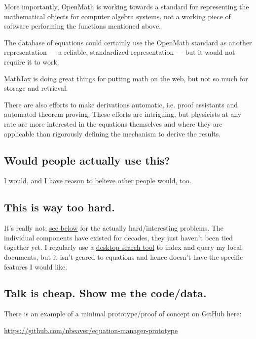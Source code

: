 \documentclass[12pt,letterpaper]{article}
\begin{document}
More importantly,
OpenMath is working towards a standard for representing the mathematical objects for computer algebra systems,
not a working piece of software performing the functions mentioned above.

The database of equations could certainly use the OpenMath standard as another representation
--- a reliable, standardized representation ---
but it would not require it to work.

\href{http://www.mathjax.org/}
{MathJax} is doing great things for putting math on the web,
but not so much for storage and retrieval.

There are also efforts to make derivations automatic,
i.e. proof assistants and automated theorem proving.
These efforts are intriguing,
but physicists at any rate are more interested in the equations themselves and where they are applicable
than rigorously defining the mechanism to derive the results.

\subsection{Would people actually use this?}

I would, and I have
\href{http://www.researchgate.net/post/I_am_looking_for_an_equation_database_or_digital_list_of_equations}
{reason to believe}
\href{http://productforums.google.com/forum/#!topic/websearch/lVJiyCSl-xk}
{other people would, too}.

\subsection{This is way too hard.}

It's really not;
\hyperref[sec:ambitious]
{see below} for the actually hard/interesting problems.
The individual components have existed for decades,
they just haven't been tied together yet.
I regularly use a
\href{https://en.wikipedia.org/wiki/Recoll}
{desktop search tool} to index and query my local documents,
but it isn't geared to equations and hence doesn't have the specific features I would like.

\subsection{Talk is cheap. Show me the code/data.}

There is an example of a minimal prototype/proof of concept on GitHub here:

\url{https://github.com/nbeaver/equation-manager-prototype}
\end{document}
